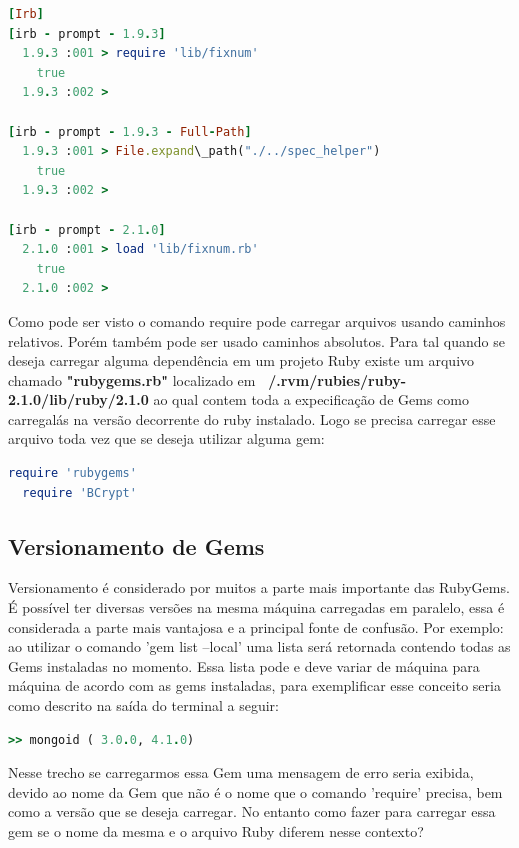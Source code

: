 {\singlespace
\begin{lstlisting}[caption=Exemplo de require e load Ruby 1.9.3 - 2.1.0,language=Ruby,label={test}]
[Irb]
[irb - prompt - 1.9.3]
  1.9.3 :001 > require 'lib/fixnum'
    true
  1.9.3 :002 >

[irb - prompt - 1.9.3 - Full-Path]
  1.9.3 :001 > File.expand\_path("./../spec_helper")
    true
  1.9.3 :002 >

[irb - prompt - 2.1.0]
  2.1.0 :001 > load 'lib/fixnum.rb'
    true
  2.1.0 :002 >
\end{lstlisting}
}

Como pode ser visto o comando  require pode carregar arquivos usando caminhos relativos. Porém também pode ser usado caminhos absolutos. Para tal quando se deseja carregar alguma dependência em um projeto Ruby existe um arquivo chamado \textbf{"rubygems.rb"} localizado em \textbf{~/.rvm/rubies/ruby-2.1.0/lib/ruby/2.1.0} ao qual contem toda a
expecificação de Gems como carregalás na versão decorrente do ruby instalado. Logo se precisa carregar esse arquivo toda vez que se deseja utilizar alguma gem:

{\singlespace
\begin{lstlisting}[caption=Exemplo de require 'rubygems',language=Ruby,label={require}]
  require 'rubygems'
  require 'BCrypt'
\end{lstlisting}
}

\subsection{Versionamento de Gems}
Versionamento é considerado por muitos a parte mais importante das RubyGems. É possível ter diversas versões na mesma máquina carregadas em
paralelo, essa é considerada a parte mais vantajosa e a principal fonte de confusão. Por exemplo: ao utilizar o comando 'gem list --local' 
uma lista será retornada contendo todas as Gems instaladas no momento. Essa lista pode e deve variar de máquina para máquina de acordo com 
as gems instaladas, para exemplificar  esse conceito seria como descrito na saída do terminal a seguir:

{\singlespace
\begin{lstlisting}[caption=Exemplo de versionamento de gems,language=Ruby,label={versionamento}]
  >> mongoid ( 3.0.0, 4.1.0)
\end{lstlisting}
}

Nesse trecho se carregarmos essa Gem uma mensagem de erro seria exibida, devido ao nome da Gem que não é o nome que o comando 'require' precisa, bem como a versão que se deseja carregar.
No entanto como fazer para carregar essa gem se o nome da mesma e o arquivo Ruby diferem nesse contexto? 

